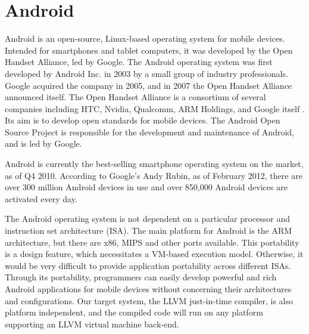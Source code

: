 \section{Android}
\label{sec:android}

Android is an open-source, Linux-based operating system for mobile devices. Intended for smartphones and tablet computers, it was developed by the Open Handset Alliance, led by Google. The Android operating system was first developed by Android Inc. in 2003 by a small group of industry professionals. Google acquired the company in 2005, and in 2007 the Open Handset Alliance announced itself. The Open Handset Alliance is a consortium of several companies including HTC, Nvidia, Qualcomm, ARM Holdings, and Google itself \cite{oha_members}. Its aim is to develop open standards for mobile devices. The Android Open Source Project is responsible for the development and maintenance of Android, and is led by Google.

Android is currently the best-selling smartphone operating system on the market, as of Q4 2010\cite{android_top}. According to Google's Andy Rubin, as of February 2012, there are over 300 million Android devices in use and over 850,000 Android devices are activated every day\footnotemark {}.

The Android operating system is not dependent on a particular processor and instruction set architecture (ISA). The main platform for Android is the ARM architecture, but there are x86, MIPS and other ports available. This portability is a design feature, which necessitates a VM-based execution model. Otherwise, it would be very difficult to provide application portability across different ISAs. Through its portability, programmers can easily develop powerful and rich Android applications for mobile devices without concerning their architectures and configurations. Our target system, the LLVM just-in-time compiler, is also platform independent, and the compiled code will run on any platform supporting an LLVM virtual machine back-end.
